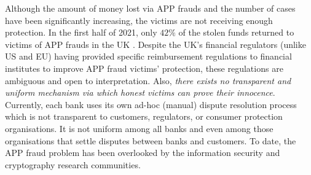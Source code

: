%
%





Although the amount of money lost via  APP frauds and the number of cases have been significantly increasing, the victims are not receiving enough protection.  In the first half of 2021, only $42\%$ of the stolen funds returned to victims of  APP frauds in the UK \cite{2021-Half-Year-Fraud-Update}.  Despite the UK's financial regulators (unlike   US and EU) having provided specific reimbursement regulations to financial institutes to improve APP fraud victims' protection, these regulations are ambiguous and open to interpretation. Also,  \emph{there exists no transparent and uniform mechanism via which honest victims can  {prove} their innocence}. Currently, each bank uses its own ad-hoc (manual) dispute resolution process which is not transparent to customers, regulators, or consumer protection organisations. It is not uniform among all banks and even among those organisations that settle disputes between banks and customers. To date, the APP fraud problem has been overlooked by the information security and cryptography research communities.


